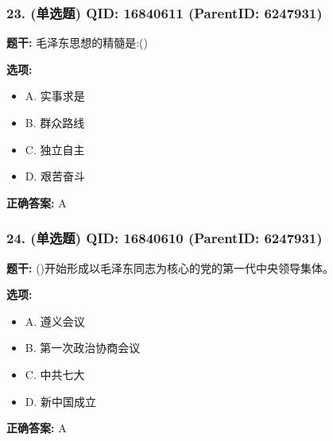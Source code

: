 \documentclass[12pt,UTF8]{ctexart}
\begin{document}
\vspace{0.3em}\hrulefill\vspace{0.7em}

\subsubsection*{23. (单选题) \small QID: 16840611 (ParentID: 6247931)}

\textbf{题干:}
毛泽东思想的精髓是:()



\textbf{选项:}
\begin{itemize}[leftmargin=*]

  \item A. 实事求是

  \item B. 群众路线

  \item C. 独立自主

  \item D. 艰苦奋斗

\end{itemize}

\textbf{正确答案:}
A

\vspace{0.3em}\hrulefill\vspace{0.7em}

\subsubsection*{24. (单选题) \small QID: 16840610 (ParentID: 6247931)}

\textbf{题干:}
()开始形成以毛泽东同志为核心的党的第一代中央领导集体。



\textbf{选项:}
\begin{itemize}[leftmargin=*]

  \item A. 遵义会议

  \item B. 第一次政治协商会议

  \item C. 中共七大

  \item D. 新中国成立

\end{itemize}

\textbf{正确答案:}
A

\vspace{0.3em}\hrulefill\vspace{0.7em}
\end{document}
